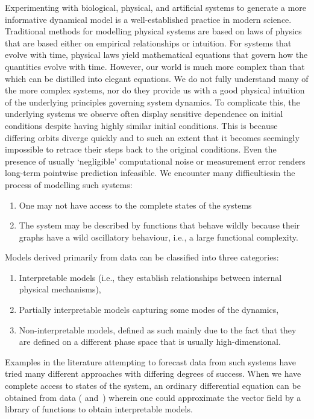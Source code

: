 
Experimenting with biological, physical, and artificial systems to generate a more informative dynamical model is a well-established practice in modern science. 
Traditional methods for modelling physical systems are based on laws of physics that are based either on empirical relationships or intuition. 
For systems that evolve with time, physical laws yield mathematical equations that govern how the quantities evolve with time. 
However, our world is much more complex than that which can be distilled into elegant equations. We do not fully understand many of the more complex systems, nor do they provide us with a good physical intuition of the underlying principles governing system dynamics. To complicate this, the underlying systems we observe often display sensitive dependence on initial conditions despite having highly similar initial conditions. This is because differing orbits diverge quickly and to such an extent that it becomes seemingly impossible to retrace their steps back to the original conditions. Even the presence of usually `negligible' computational noise or measurement error renders long-term pointwise prediction infeasible. We encounter many difficultiesin the process of modelling such systems:

\vspace{-8mm}
\begin{enumerate}[noitemsep, label=\roman*.]
  \item One may not have access to the complete states of the systems
  \item The system may be described by functions that behave wildly because their graphs have a wild oscillatory behaviour, i.e., a large functional complexity.
\end{enumerate}


Models derived primarily from data can be classified into three categories: 
\vspace{-8mm}
\begin{enumerate}[noitemsep, label=\roman*.]
  \item  Interpretable models (i.e., they establish relationships between internal physical mechanisms), 
  \item Partially interpretable models capturing some modes of the dynamics, 
  \item Non-interpretable models, defined as such mainly due to the fact that they are defined on a different phase space that is usually high-dimensional. 
\end{enumerate}

Examples in the literature attempting to forecast data from such systems have tried many different approaches with differing degrees of success. 
When we have complete access to states of the system, an ordinary differential equation can be obtained from data (\cite{brunton2016discovering, champion2019data} and~\cite{small2002modeling,xu2006modeling}) wherein one could approximate the vector field by a library of functions to obtain interpretable models. 


